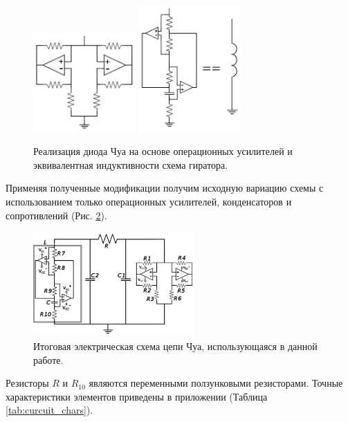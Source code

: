 \documentclass[12pt]{article}
\begin{document}
\begin{figure}[H]
	\centering
	\includegraphics[width=0.35\textwidth]{OA.jpg}
	\hfil
	\includegraphics[width=0.35\textwidth]{gyrator.jpg}
	\caption{Реализация диода Чуа на основе операционных усилителей и эквивалентная индуктивности схема гиратора.}
	\label{fig:OA_Gyrator}
\end{figure}

Применяя полученные модификации получим исходную вариацию схемы с использованием только операционных усилителей, конденсаторов и сопротивлений (Рис. \ref{fig:final_curcuit}).
\begin{figure}[H]
	\centering
	\includegraphics[width=0.55\textwidth]{chua_curcuit.jpg}
	\caption{Итоговая электрическая схема цепи Чуа, использующаяся в данной работе.}
	\label{fig:final_curcuit}
\end{figure}

Резисторы $R$ и $R_{10}$ являются переменными ползунковыми резисторами.
Точные характеристики элементов приведены в приложении (Таблица \ref{tab:curcuit_chars}).
\end{document}
